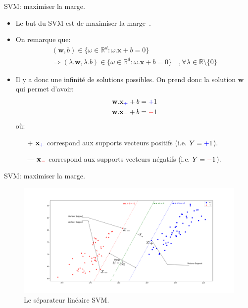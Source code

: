 \documentclass[8pt]{beamer}
\begin{document}
		\begin{frame}{SVM\@: maximiser la marge.}
			\begin{itemize}
				\item  Le but du SVM est de maximiser la marge~\cite{vapnik1998statistical}.
				\item  On remarque que:
				\begin{gather*}
					(\textbf{w}, b) \in \{\omega \in \mathbb{R}^d : \omega.\textbf{x} + b = 0\} \\
					\Rightarrow
					(\lambda . \textbf{w}, \lambda.b) \in \{\omega \in \mathbb{R}^d : \omega.\textbf{x} + b = 0\}\quad, \forall \lambda \in \mathbb{R}\setminus\{0\}
				\end{gather*}
				\item  Il y a donc une infinité de solutions possibles. On prend donc la solution $\textbf{w}$ qui permet d'avoir:
				\begin{align}
					\textbf{w}.\textbf{x}_{\color{blue}+} + b &= {\color{blue}+}1 \\
					\textbf{w}.\textbf{x}_{\color{red}-} + b &= {\color{red}-}1
				\end{align}
				où:
				\begin{itemize}
					\item[{\color{blue}+}] $\textbf{x}_{\color{blue}+}$ correspond aux supports vecteurs positifs (i.e. $Y={\color{blue}+}1$).
					\item[{\color{red}---}] $\textbf{x}_{\color{red}-}$ correspond aux supports vecteurs négatifs (i.e. $Y={\color{red}-}1$).
				\end{itemize}
			\end{itemize}
		\end{frame}

		\begin{frame}{SVM\@: maximiser la marge.}
			\begin{figure}[H]
				\includegraphics[width=\textwidth]{images/samples/svm_margin}
				\caption{\label{fig::margin} Le séparateur linéaire SVM.}
			\end{figure}
		\end{frame}
\end{document}
